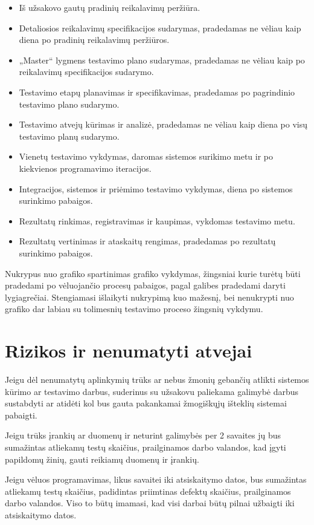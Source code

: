 \documentclass{VUMIFPSkursinis}
\begin{document}
    \begin{itemize}
    	\item Iš užsakovo gautų pradinių reikalavimų peržiūra.
    	\item Detaliosios reikalavimų specifikacijos sudarymas, pradedamas ne vėliau kaip diena po pradinių reikalavimų peržiūros.
    	\item „Master“ lygmens testavimo plano sudarymas, pradedamas ne vėliau kaip po reikalavimų specifikacijos sudarymo.
    	\item Testavimo etapų planavimas ir specifikavimas, pradedamas po pagrindinio testavimo plano sudarymo.
    	\item Testavimo atvejų kūrimas ir analizė, pradedamas ne vėliau kaip diena po visų testavimo planų sudarymo.
    	\item Vienetų testavimo vykdymas, daromas sistemos surikimo metu ir po kiekvienos programavimo iteracijos.
    	\item Integracijos, sistemos ir priėmimo testavimo vykdymas, diena po sistemos surinkimo pabaigos.
    	\item Rezultatų rinkimas, registravimas ir kaupimas, vykdomas testavimo metu.
    	\item Rezultatų vertinimas ir ataskaitų rengimas, pradedamas po rezultatų surinkimo pabaigos.
    \end{itemize}

    Nukrypus nuo grafiko spartinimas grafiko vykdymas, žingsniai kurie turėtų būti pradedami po vėluojančio procesų pabaigos, pagal galibes pradedami daryti lygiagrečiai. 
    Stengiamasi išlaikyti nukrypimą kuo mažesnį, bei nenukrypti nuo grafiko dar labiau su tolimesnių testavimo proceso žingsnių vykdymu. 
    
    \section{Rizikos ir nenumatyti atvejai}

    Jeigu dėl nenumatytų aplinkymių trūks ar nebus žmonių gebančių atlikti sistemos kūrimo ar testavimo darbus, 
     suderinus su užsakovu paliekama galimybė darbus sustabdyti ar atidėti kol bus gauta pakankamai žmogiškųjų išteklių sistemai pabaigti. 

    Jeigu trūks įrankių ar duomenų ir neturint galimybės per 2 savaites jų bus sumažintas atliekamų testų skaičius, prailginamos darbo valandos, kad įgyti papildomų žinių, gauti reikiamų duomenų ir įrankių.

    Jeigu vėluos programavimas, likus savaitei iki atsiskaitymo datos, bus sumažintas atliekamų testų skaičius, padidintas priimtinas defektų skaičius, prailginamos darbo valandos. Viso to būtų imamasi, kad visi darbai būtų pilnai užbaigti iki atsiskaitymo datos.
\end{document}
